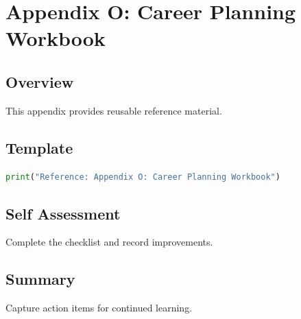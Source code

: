 \chapter{Appendix O: Career Planning Workbook}
\label{chap:vol16-5}



\section{Overview}
This appendix provides reusable reference material.

\section{Template}
\begin{lstlisting}[language=Python]
print("Reference: Appendix O: Career Planning Workbook")
\end{lstlisting}

\section{Self Assessment}
\begin{exercise}
Complete the checklist and record improvements.
\end{exercise}

\section{Summary}
Capture action items for continued learning.
